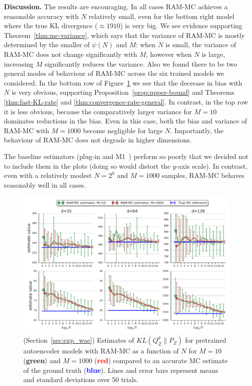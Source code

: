 \textbf{Discussion.}
The results are encouraging. 
In all cases RAM-MC achieves a reasonable accuracy with $N$ relatively small, even for the bottom right model where the true KL divergence ($\approx 1910$) is very big.
We see evidence supporting Theorem~\ref{thm:mc-variance}, which says that the variance of RAM-MC is mostly determined by the smaller of $\psi(N)$ and $M$:
when $N$ is small, the variance of RAM-MC does not change significantly with $M$, 
however when $N$ is large, increasing $M$ significantly reduces the variance. 
Also we found there to be two general modes of behaviour of RAM-MC across the six trained models we considered. 
In the bottom row of Figure~\ref{fig:real-exps} we see that the decrease in bias with $N$ is very obvious, supporting Proposition~\ref{prop:upper-bound} and Theorems \ref{thm:fast-KL-rate} and \ref{thm:convergence-rate-general}.
In contrast, in the top row it is less obvious, because the comparatively larger variance for $M{=}10$ dominates reductions in the bias.
Even in this case, both the bias and variance of RAM-MC with $M{=}1000$ become negligible for large $N$.
Importantly, the behaviour of RAM-MC does not degrade in higher dimensions.


The baseline estimators (plug-in \cite{moon14ensemble} and M1~\cite{nguyen10ratio}) perform so poorly that we decided not to include them in the plots (doing so would distort the $y$-axis scale).
In contrast, even with a relatively modest $N{=}2^8$ and $M{=}1000$ samples, RAM-MC behaves reasonably well in all cases.

\begin{figure}
\begin{center}
\includegraphics[width=1.\textwidth, height=0.615\textwidth]{pics/NeurIPS_wae_exps_plot.pdf}
\end{center}
\caption{\label{fig:real-exps}
(Section~\ref{sec:exp_wae}) Estimates of $KL(Q_Z^\theta \| P_Z)$ for pretrained autoencoder models with RAM-MC as a function of $N$ for $M{=}10$ ({\bf \textcolor{green!65!blue}{green}}) and $M{=}1000$ ({\bf \textcolor{red}{red}}) compared to an accurate MC estimate of the ground truth ({\bf\textcolor{blue}{blue}}).
Lines and error bars represent means and standard deviations over 50 trials.
}
\end{figure}